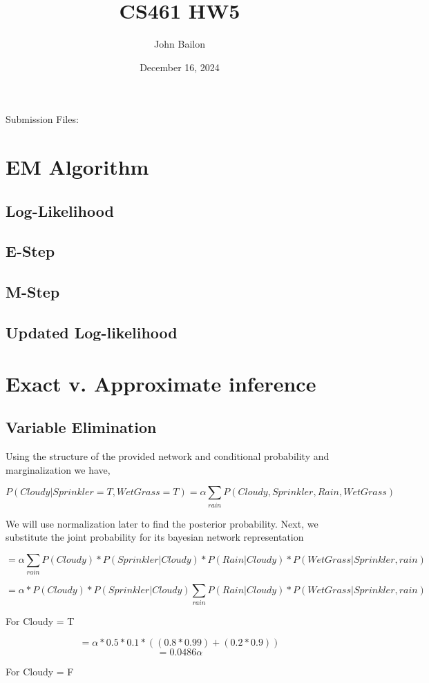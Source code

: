 \documentclass{article}
\title{CS461 HW5}
\author{John Bailon}
\date{December 16, 2024}
\begin{document}
\maketitle

\noindent
Submission Files:

\section{EM Algorithm}
\subsection{Log-Likelihood}
\subsection{E-Step}
\subsection{M-Step}
\subsection{Updated Log-likelihood}

\section{Exact v. Approximate inference}
\subsection{Variable Elimination}
Using the structure of the provided network and conditional probability and marginalization we have,

\[ P(Cloudy | Sprinkler = T, WetGrass = T) = \alpha\sum_{rain} P(Cloudy, Sprinkler, Rain, Wet Grass)\]

We will use normalization later to find the posterior probability. Next, we substitute the joint probability for its bayesian network representation

\[ = \alpha \sum_{rain} P(Cloudy) * P(Sprinkler | Cloudy) * P(Rain | Cloudy) * P(WetGrass | Sprinkler, rain)\]

\[ = \alpha * P(Cloudy) * P(Sprinkler | Cloudy) \sum_{rain} P(Rain | Cloudy) * P(WetGrass | Sprinkler, rain)\]

For Cloudy = T

\[ = \alpha * 0.5 * 0.1 * ((0.8 * 0.99) + (0.2 * 0.9))\]
\[ = 0.0486\alpha\]

For Cloudy = F
\end{document}
